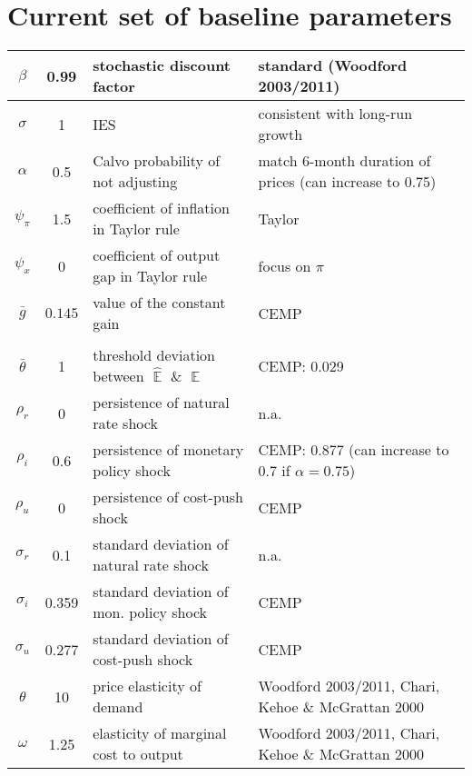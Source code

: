 \documentclass[11pt]{article}
\renewcommand{\[}{\begin{equation}}
\renewcommand{\]}{\end{equation}}
\DeclareMathOperator{\E}{\mathbb{E}}
\begin{document}
\clearpage
\section{Current set of baseline parameters}
\begin{tabular}{ c | c  | l | l}
 $\beta$ & 0.99 & stochastic discount factor & standard (Woodford 2003/2011) \\  \hline
 $\sigma$ & 1  & IES & consistent with long-run growth \\  \hline
 $\alpha$ & 0.5 &  Calvo probability of not adjusting  & match 6-month duration of prices (can increase to 0.75)\\\hline
 $\psi_{\pi} $& 1.5  & coefficient of inflation in Taylor rule & Taylor \\\hline
 $\psi_x$ & 0   & coefficient of output gap in Taylor rule  & focus on $\pi$\\\hline
 $\bar{g}$ & $0.145$  & value of the constant gain & CEMP \\\hline
& & \\ [-1em] %
 $\bar{\theta}$ &  1  & threshold deviation between $\hat{\E}$ \& $\E$ & CEMP: 0.029\\ \hline
    $\rho_r$ & 0 &   persistence of natural rate shock & n.a. \\ \hline
    $\rho_i$ & 0.6 &  persistence of monetary policy shock & CEMP: 0.877  (can increase to 0.7 if $\alpha=0.75$) \\ \hline
    $\rho_u$ & 0  &  persistence of cost-push shock  & CEMP\\ \hline
    $\sigma_r$ & 0.1 & standard deviation of natural rate shock & n.a. \\ \hline
    $\sigma_i$ &  0.359  &standard deviation of mon. policy shock & CEMP \\ \hline
    $\sigma_u$ & 0.277 & standard deviation of cost-push shock & CEMP  \\ \hline
    $\theta$ & 10 & price elasticity of demand &Woodford 2003/2011, Chari, Kehoe \& McGrattan 2000  \\ \hline
    $\omega$ & 1.25 & elasticity of marginal cost to output &Woodford 2003/2011,  Chari, Kehoe \& McGrattan 2000  \\ \hline
\end{tabular}
\end{document}
